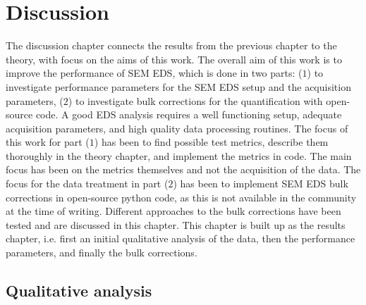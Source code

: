 %
\chapter{Discussion}
\label{ch:discussion}

The discussion chapter connects the results from the previous chapter to the theory, with focus on the aims of this work.
The overall aim of this work is to improve the performance of SEM EDS, which is done in two parts:
($1$) to investigate performance parameters for the SEM EDS setup and the acquisition parameters, ($2$) to investigate bulk corrections for the quantification with open-source code.
A good EDS analysis requires a well functioning setup, adequate acquisition parameters, and high quality data processing routines.
The focus of this work for part ($1$) has been to find possible test metrics, describe them thoroughly in the theory chapter, and implement the metrics in code.
The main focus has been on the metrics themselves and not the acquisition of the data.
The focus for the data treatment in part ($2$) has been to implement SEM EDS bulk corrections in open-source python code, as this is not available in the community at the time of writing.
Different approaches to the bulk corrections have been tested and are discussed in this chapter.
This chapter is built up as the results chapter, i.e. first an initial qualitative analysis of the data, then the performance parameters, and finally the bulk corrections.











\section{Qualitative analysis}
\label{discussion:qualitative_analysis}


